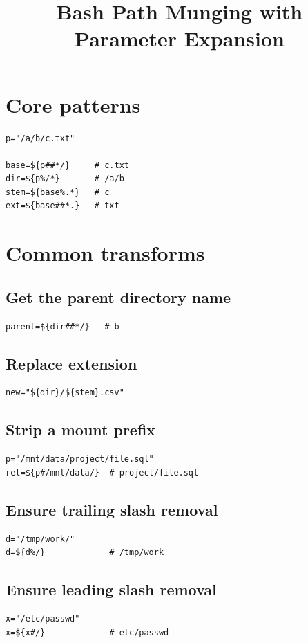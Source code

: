\documentclass[11pt]{article}
\title{Bash Path Munging with Parameter Expansion}
\author{}
\date{}
\begin{document}
\maketitle

\section{Core patterns}
\begin{lstlisting}
p="/a/b/c.txt"

base=${p##*/}     # c.txt
dir=${p%/*}       # /a/b
stem=${base%.*}   # c
ext=${base##*.}   # txt
\end{lstlisting}

\section{Common transforms}
\subsection{Get the parent directory name}
\begin{lstlisting}
parent=${dir##*/}   # b
\end{lstlisting}

\subsection{Replace extension}
\begin{lstlisting}
new="${dir}/${stem}.csv"
\end{lstlisting}

\subsection{Strip a mount prefix}
\begin{lstlisting}
p="/mnt/data/project/file.sql"
rel=${p#/mnt/data/}  # project/file.sql
\end{lstlisting}

\subsection{Ensure trailing slash removal}
\begin{lstlisting}
d="/tmp/work/"
d=${d%/}             # /tmp/work
\end{lstlisting}

\subsection{Ensure leading slash removal}
\begin{lstlisting}
x="/etc/passwd"
x=${x#/}             # etc/passwd
\end{lstlisting}
\end{document}
